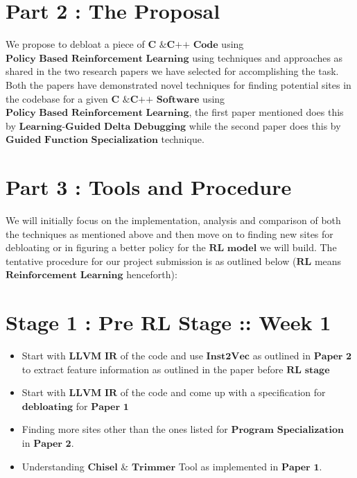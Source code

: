 \documentclass{article} %
\begin{document}
\section*{Part 2 : The Proposal}
We propose to debloat a piece of $\textbf{C \& C++ Code}$ using $\textbf{Policy Based Reinforcement Learning}$ using techniques and approaches as shared in the two research papers we have selected for accomplishing the task. Both the papers have demonstrated novel techniques for finding potential sites in the codebase for a given $\textbf{C \& C++ Software}$ using $\textbf{Policy Based Reinforcement Learning}$, the first paper mentioned does this by $\textbf{Learning-Guided Delta Debugging}$  while the second paper does this by $\textbf{Guided Function Specialization}$ technique. 

\section*{Part 3 : Tools and Procedure}
We will initially focus on the implementation, analysis and comparison of both the techniques as mentioned above and then move on to finding new sites for debloating or in figuring a better policy for the $\textbf{RL model}$ we will build. The tentative procedure for our project submission is as outlined below ($\textbf{RL}$ means $\textbf{Reinforcement Learning}$ henceforth):
\section*{Stage 1 : Pre RL Stage :: Week 1}
\begin{itemize}
    \item Start with $\textbf{LLVM IR}$ of the code and use $\textbf{Inst2Vec}$ as outlined in $\textbf{Paper 2}$ to extract feature information as outlined in the paper before $\textbf{RL stage}$
    \item Start with $\textbf{LLVM IR}$ of the code and come up with a specification for $\textbf{debloating}$ for $\textbf{Paper 1}$
    \item Finding more sites other than the ones listed for $\textbf{Program Specialization}$ in $\textbf{Paper 2}$.  
    \item Understanding $\textbf{Chisel}$ \& $\textbf{Trimmer}$ Tool as implemented in $\textbf{Paper 1}$.
\end{itemize}
\end{document}
